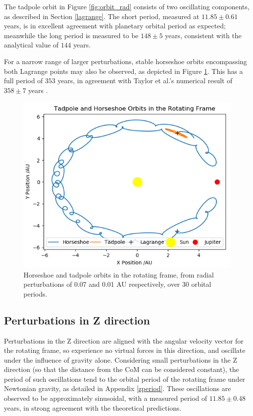 \documentclass[11pt, a4paper,twocolumn]{article} %
\begin{document}
The tadpole orbit in Figure \ref{fig:orbit_rad} consists of two oscillating components, as described in Section \ref{lagrange}. The short period, measured at $11.85 \pm 0.61$ years, is in excellent agreement with  planetary orbital period as expected; meanwhile the long period is measured to be $148 \pm 5$ years, consistent with the analytical value of $144$ years.

For a narrow range of larger perturbations, stable horseshoe orbits encompassing both Lagrange points may also be observed, as depicted in Figure \ref{fig:horseshoe}. This has a full period of $353$ years, in agreement with Taylor et al.'s numerical result of $358 \pm 7$ years \cite{Taylor1981}.


\begin{figure}
	\centering
	\includegraphics[width=0.8\linewidth]{Figures/horseshoe}
	\caption{Horseshoe and tadpole orbits in the rotating frame, from radial perturbations of 0.07 and 0.01 AU respectively, over 30 orbital periods.}
	\label{fig:horseshoe}
\end{figure}

\subsection{Perturbations in Z direction} \label{3D}
Perturbations in the Z direction are aligned with the angular velocity vector for the rotating frame, so experience no virtual forces in this direction, and oscillate under the influence of gravity alone. Considering small perturbations in the Z direction (so that the distance from the CoM can be considered constant), the period of such oscillations tend to the orbital period of the rotating frame under Newtonian gravity, as detailed in Appendix \ref{zperiod}. These oscillations are observed to be approximately sinusoidal, with a measured period of $11.85 \pm 0.48$ years, in strong agreement with the theoretical predictions.
\end{document}

